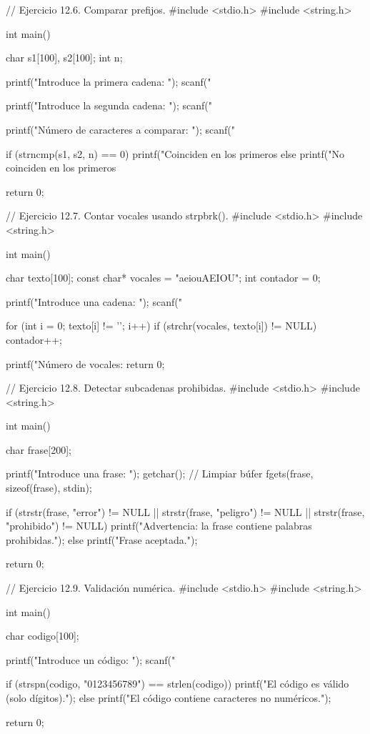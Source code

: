 // Ejercicio 12.6. Comparar prefijos.
#include <stdio.h>
#include <string.h>

int main() {
   char s1[100], s2[100];
   int n;
   
   printf("Introduce la primera cadena: ");
   scanf("%
   
   printf("Introduce la segunda cadena: ");
   scanf("%
   
   printf("Número de caracteres a comparar: ");
   scanf("%
   
   if (strncmp(s1, s2, n) == 0) {
      printf("Coinciden en los primeros %
   } else {
      printf("No coinciden en los primeros %
   }
   
   return 0;
}





// Ejercicio 12.7. Contar vocales usando strpbrk().
#include <stdio.h>
#include <string.h>

int main() {
   char texto[100];
   const char* vocales = "aeiouAEIOU";
   int contador = 0;
   
   printf("Introduce una cadena: ");
   scanf("%
   
   for (int i = 0; texto[i] != '\0'; i++) {
      if (strchr(vocales, texto[i]) != NULL) {
         contador++;
      }
   }
   
   printf("Número de vocales: %
   return 0;
}




// Ejercicio 12.8. Detectar subcadenas prohibidas.
#include <stdio.h>
#include <string.h>

int main() {
   char frase[200];
   
   printf("Introduce una frase: ");
   getchar(); // Limpiar búfer
   fgets(frase, sizeof(frase), stdin);
   
   if (strstr(frase, "error") != NULL || strstr(frase, "peligro") != NULL ||
         strstr(frase, "prohibido") != NULL) {
      printf("Advertencia: la frase contiene palabras prohibidas.\n");
   } else {
      printf("Frase aceptada.\n");
   }
   
   return 0;
}




// Ejercicio 12.9. Validación numérica.
#include <stdio.h>
#include <string.h>

int main() {
   char codigo[100];
   
   printf("Introduce un código: ");
   scanf("%
   
   if (strspn(codigo, "0123456789") == strlen(codigo)) {
      printf("El código es válido (solo dígitos).\n");
   } else {
      printf("El código contiene caracteres no numéricos.\n");
   }
   
   return 0;
}




